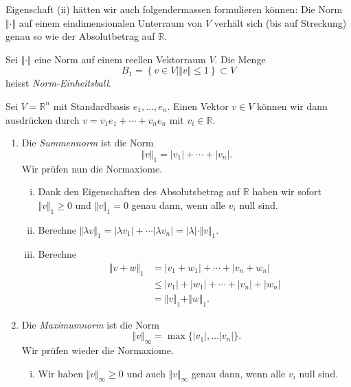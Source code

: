 \documentclass[../main.tex]{subfiles}
\begin{document}
Eigenschaft (ii) hätten wir auch folgendermassen formulieren können:
Die Norm $\Vert \cdot \Vert$ auf einem eindimensionalen Unterraum
von $V$ verhält sich (bis auf Streckung) genau so wie der Absolutbetrag
auf $\mathbb{R}$.

\begin{definition}
  Sei $\Vert \cdot \Vert$ eine Norm auf einem reellen Vektorraum $V$.
  Die Menge
  \[
    B_1 = \left\{v \in V \mid \Vert v \Vert \leq 1\right\} \subset V
  \]
  heisst \emph{Norm-Einheitsball}.
\end{definition}

\begin{examples}
  Sei $V = \mathbb{R}^n$ mit Standardbasis $e_1, \dots, e_n$.
  Einen Vektor $v \in V$ können wir dann ausdrücken durch
  $v = v_1 e_1 + \cdots + v_n e_n$ mit $v_i \in \mathbb{R}$.
  \begin{enumerate}[(1)]
    \item Die \emph{Summennorm} ist die Norm
      \[
        \Vert v \Vert_1 = |v_1| + \cdots + |v_n|.
      \]
      Wir prüfen nun die Normaxiome.
      \begin{enumerate}[(i)]
        \item Dank den Eigenschaften des
          Absolutsbetrag auf $\mathbb{R}$ haben wir sofort 
          $\Vert v \Vert_1 \geq 0$ 
          und $\Vert v \Vert_1 = 0$ genau dann, wenn alle $v_i$ null sind.
        \item Berechne $\Vert \lambda v \Vert_1
          = |\lambda v_1| + \cdots |\lambda v_n| = |\lambda| \cdot
          \Vert v \Vert_1$.
        \item Berechne
          \begin{align*}
            \Vert v + w \Vert_1
            &= |v_1 + w_1| + \cdots + |v_n + w_n| \\
            & \leq |v_1| + |w_1| + \cdots + |v_n| + |w_n| \\
            &= \Vert v \Vert_1 + \Vert w \Vert_1.
          \end{align*}
      \end{enumerate}
    \item Die \emph{Maximumnorm}
      ist die Norm
      \[
        \Vert v \Vert_{\infty}
        = \max \{ |v_1|, \dots |v_n|\}.
      \]
      Wir prüfen wieder die Normaxiome.
      \begin{enumerate}[(i)]
        \item Wir haben $\Vert v \Vert_{\infty} \geq 0$
          und auch $\Vert v \Vert_{\infty}$ genau dann,
          wenn alle $v_i$ null sind.

\end{enumerate}
\end{enumerate}
\end{examples}
\end{document}
